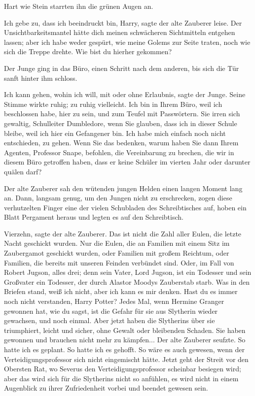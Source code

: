 Hart wie Stein starrten ihn die grünen Augen an.

\glqq{}Ich gebe zu, dass ich beeindruckt bin, Harry\grqq{}, sagte der alte
Zauberer leise. \glqq{}Der Unsichtbarkeitsmantel hätte dich meinen schwächeren
Sichtmitteln entgehen lassen; aber ich habe weder gespürt, wie meine Golems zur
Seite traten, noch wie sich die Treppe drehte. Wie bist du hierher
gekommen?\grqq{}

Der Junge ging in das Büro, einen Schritt nach dem anderen, bis sich die Tür
sanft hinter ihm schloss.

\glqq{}Ich kann gehen, wohin ich will, mit oder ohne Erlaubnis\grqq{}, sagte der
Junge. Seine Stimme wirkte ruhig; zu ruhig vielleicht. \glqq{}Ich bin in Ihrem
Büro, weil ich beschlossen habe, hier zu sein, und zum Teufel mit Passwörtern.
Sie irren sich gewaltig, Schulleiter Dumbledore, wenn Sie glauben, dass ich in
dieser Schule bleibe, weil ich hier ein Gefangener bin. Ich habe mich einfach
noch nicht entschieden, zu gehen. Wenn Sie das bedenken, warum haben Sie dann
Ihrem Agenten, Professor Snape, befohlen, die Vereinbarung zu brechen, die wir
in diesem Büro getroffen haben, dass er keine Schüler im vierten Jahr oder
darunter quälen darf?\grqq{}

Der alte Zauberer sah den wütenden jungen Helden einen langen Moment lang an.
Dann, langsam genug, um den Jungen nicht zu erschrecken, zogen diese
verhutzelten Finger eine der vielen Schubladen des Schreibtisches auf, hoben ein
Blatt Pergament heraus und legten es auf den Schreibtisch.

\glqq{}Vierzehn\grqq{}, sagte der alte Zauberer. \glqq{}Das ist nicht die Zahl
aller Eulen, die letzte Nacht geschickt wurden. Nur die Eulen, die an Familien
mit einem Sitz im Zaubergamot geschickt wurden, oder Familien mit großem
Reichtum, oder Familien, die bereits mit unseren Feinden verbündet sind. Oder,
im Fall von Robert Jugson, alles drei; denn sein Vater, Lord Jugson, ist ein
Todesser und sein Großvater ein Todesser, der durch Alastor Moodys Zauberstab
starb. Was in den Briefen stand, weiß ich nicht, aber ich kann es mir denken.
Hast du es immer noch nicht verstanden, Harry Potter? Jedes Mal, wenn Hermine
Granger gewonnen hat, wie du sagst, ist die Gefahr für sie aus Slytherin wieder
gewachsen, und noch einmal. Aber jetzt haben die Slytherins über sie
triumphiert, leicht und sicher, ohne Gewalt oder bleibenden Schaden. Sie haben
gewonnen und brauchen nicht mehr zu kämpfen...\grqq{} Der alte Zauberer seufzte.
\glqq{}So hatte ich es geplant. So hatte ich es gehofft. So wäre es auch gewesen,
wenn der Verteidigungsprofessor sich nicht eingemischt hätte. Jetzt geht der
Streit vor den Obersten Rat, wo Severus den Verteidigungsprofessor scheinbar
besiegen wird; aber das wird sich für die Slytherins nicht so anfühlen, es wird
nicht in einem Augenblick zu ihrer Zufriedenheit vorbei und beendet gewesen
sein.\grqq{}

